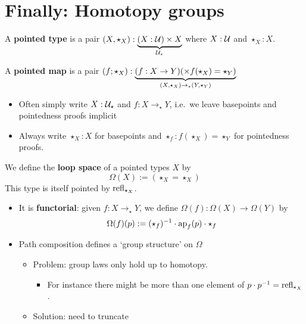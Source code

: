 \documentclass[10pt,oneside,leqno,openright]{memoir}
\begin{document}
\section*{Finally: Homotopy groups}

\begin{definition}
    A \textbf{pointed type} is a pair $(X, \star_X) : \underset{\mathcal{U}_\star}{\underbrace{(X : \mathcal{U}) \times X}}$ where $X : \mathcal{U}$ and $\star_X : X$.
\end{definition}
\begin{definition}
  A \textbf{pointed map} is a pair $(f ; \star_X) : \underset{(X,\star_X) \to_\star (Y,\star_Y)}{\underbrace{(f : X \to Y) (\times f(\star_X) = \star_Y)}}$
\end{definition}
\begin{notation}\phantom{.}
  \begin{itemize}
  \item Often simply write $X : \mathcal{U}_\star$ and $f : X \to_\star Y$, i.e.\ we leave basepoints and pointedness proofs implicit
  \item Always write $\star_X : X$ for basepoints and $\star_f : f(\star_X) = \star_Y$ for pointedness proofs. 
  \end{itemize}
\end{notation}

\begin{definition}
    We define the \textbf{loop space} of a pointed types $X$ by
    \[ \Omega(X) := (\star_X = \star_X)\]
This type is itself pointed by $\mathrm{refl}_{\star_X}$.
\end{definition}

\begin{itemize}
  \item It is \textbf{functorial}: given $f : X \to_\star Y$, we define $\Omega(f) : \Omega(X) \to \Omega(Y)$ by
    \[\Omega(f)(p) := (\star_f)^{-1} \cdot \operatorname{ap}_f(p) \cdot \star_f\]
  \item Path composition defines a `group structure' on $\Omega$
    \begin{itemize}
    \item Problem: group laws only hold up to homotopy.
      \begin{itemize}
      \item For instance there might be more than one element of $p \cdot p^{-1} = \mathrm{refl}_{\star_X}$.
      \end{itemize}
    \item Solution: need to truncate
    \end{itemize}
\end{itemize}
\end{document}
